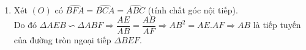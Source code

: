 \begin{ex}
{\begin{enumerate}
Xét đường tròn $(A)$ ta có $\widehat{BDC}=\dfrac{1}{2}\widehat{BAC}$. Mà dây $BC$ cố định nên $\widehat{BAC}$ không đổi (do $\widehat{BAC}$ là góc nội tiếp $(O)$). Do đó $\widehat{BDC}$ có độ lớn không phụ thuộc vào vị trí của điểm $M$.
\item Xét $(O)$ có $\widehat{BFA}=\widehat{BCA}=\widehat{ABC}$ (tính chất góc nội tiếp).\\
Do đó $\Delta AEB\backsim \Delta ABF\Rightarrow \dfrac{AE}{AB}=\dfrac{AB}{AF}\Rightarrow AB^{2}=AE.AF\Rightarrow AB$ là tiếp tuyến của đường tròn ngoại tiếp $\Delta BEF$.
\end{enumerate}
}
\end{ex}
